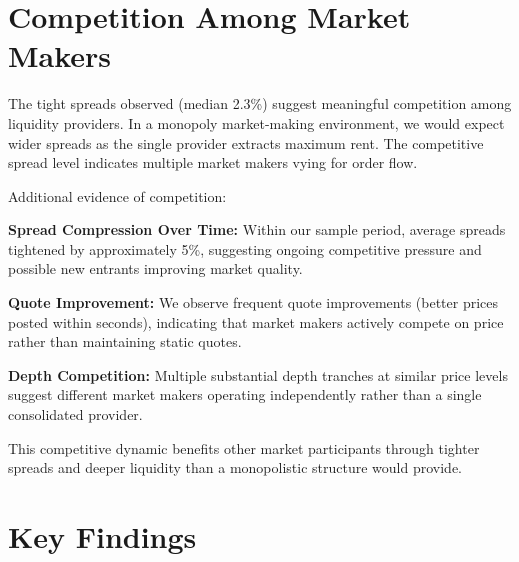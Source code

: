 \section{Competition Among Market Makers}

The tight spreads observed (median 2.3\%) suggest meaningful competition among liquidity providers. In a monopoly market-making environment, we would expect wider spreads as the single provider extracts maximum rent. The competitive spread level indicates multiple market makers vying for order flow.

Additional evidence of competition:

\textbf{Spread Compression Over Time:} Within our sample period, average spreads tightened by approximately 5\%, suggesting ongoing competitive pressure and possible new entrants improving market quality.

\textbf{Quote Improvement:} We observe frequent quote improvements (better prices posted within seconds), indicating that market makers actively compete on price rather than maintaining static quotes.

\textbf{Depth Competition:} Multiple substantial depth tranches at similar price levels suggest different market makers operating independently rather than a single consolidated provider.

This competitive dynamic benefits other market participants through tighter spreads and deeper liquidity than a monopolistic structure would provide.

\section{Key Findings}

